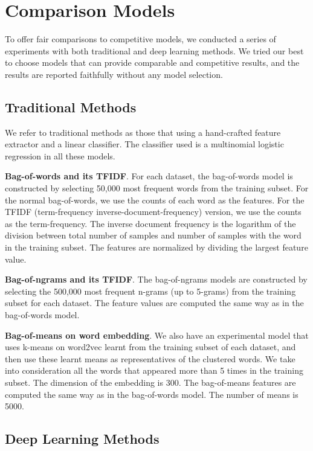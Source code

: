 \section{Comparison Models}

To offer fair comparisons to competitive models, we conducted a series of experiments with both traditional and deep learning methods. We tried our best to choose models that can provide comparable and competitive results, and the results are reported faithfully without any model selection.

\subsection{Traditional Methods}

We refer to traditional methods as those that using a hand-crafted feature extractor and a linear classifier. The classifier used is a multinomial logistic regression in all these models.

\textbf{Bag-of-words and its TFIDF}. For each dataset, the bag-of-words model is constructed by selecting 50,000 most frequent words from the training subset. For the normal bag-of-words, we use the counts of each word as the features. For the TFIDF (term-frequency inverse-document-frequency)\cite{J72} version, we use the counts as the term-frequency. The inverse document frequency is the logarithm of the division between total number of samples and number of samples with the word in the training subset. The features are normalized by dividing the largest feature value.

\textbf{Bag-of-ngrams and its TFIDF}. The bag-of-ngrams models are constructed by selecting the 500,000 most frequent n-grams (up to 5-grams) from the training subset for each dataset. The feature values are computed the same way as in the bag-of-words model.

\textbf{Bag-of-means on word embedding}. We also have an experimental model that uses k-means on word2vec\cite{MSCCD13} learnt from the training subset of each dataset, and then use these learnt means as representatives of the clustered words. We take into consideration all the words that appeared more than 5 times in the training subset. The dimension of the embedding is 300. The bag-of-means features are computed the same way as in the bag-of-words model. The number of means is 5000.

\subsection{Deep Learning Methods}

